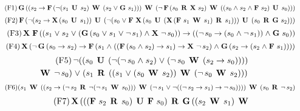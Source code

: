 \begin{table}[h]

\begin{equation}\tag{F1}
\G ((s_2 \mathrel{\rightarrow} \F (\mathop{\neg}(s_1 \U  s_2) \W  (s_2 \mathrel{\vee} \G s_1))) \W  (\mathop{\neg}\F (s_0 \R  \X s_2) \W  ((s_0 \mathrel{\wedge} s_2 \mathrel{\wedge} \F s_2) \U  s_0)))
\end{equation}
%
\squeeze
%
\begin{equation}\tag{F2}
\F (\mathop{\neg}(s_2 \mathrel{\rightarrow} \X (s_0 \U  s_1)) \U  (\mathop{\neg}(s_0 \mathrel{\vee} \F \X (s_0 \U  (\X (\F s_1 \W  s_1) \R  s_1))) 
\U  (s_0 \R  \G s_2)))
\end{equation}
%
\squeeze
%
\begin{equation}\tag{F3}
\X \F ((s_1 \mathrel{\vee} s_2 \mathrel{\vee} (\G (s_0 \mathrel{\vee} s_1 \mathrel{\vee} \mathop{\neg}s_1) \mathrel{\wedge} \X \mathop{\neg}s_0)) \mathrel{\rightarrow} \\
((\mathop{\neg}s_0 \mathrel{\rightarrow} (s_0 \mathrel{\wedge} \mathop{\neg}s_1)) \mathrel{\wedge} \G s_0))
\end{equation}
%
\squeeze
%
\begin{equation}\tag{F4}
\X (\mathop{\neg}\G (s_0 \mathrel{\rightarrow} s_2) \mathrel{\rightarrow} \F (s_1 \mathrel{\wedge} ((\F (s_0 \mathrel{\wedge} s_2) \mathrel{\rightarrow} s_1) \mathrel{\rightarrow} \X \mathop{\neg}s_2) \mathrel{\wedge} \G (s_2 \mathrel{\rightarrow} (s_2 \mathrel{\wedge} \F s_1))))
\end{equation}
%
\squeezemore
%
\begin{multline}\tag{F5}
\mathop{\neg}((s_0 \U  (\mathop{\neg}(\mathop{\neg}s_0 \mathrel{\wedge} s_2) \mathrel{\vee} (\mathop{\neg}s_0 \W  (s_2 \mathrel{\rightarrow} s_0)))) \\
\W  \mathop{\neg}s_0) \mathrel{\vee}
(s_1 \R  ((s_1 \mathrel{\vee} (s_0 \W  s_2)) \W  (\mathop{\neg}s_0 \W  s_2)))
\end{multline}
%
\squeeze
%
\begin{equation}\tag{F6}
(s_1 \W  ((s_2 \mathrel{\rightarrow} (\mathop{\neg}s_2 \R  \mathop{\neg}(\mathop{\neg}s_1 \W  s_0))) \W  (\mathop{\neg}s_1 \mathrel{\vee} \mathop{\neg}((\mathop{\neg}s_2 \mathrel{\rightarrow} s_1) \mathrel{\rightarrow} \mathop{\neg}s_0)))) \W  (s_0 \R  \mathop{\neg}s_2)
\end{equation}
%
\squeezemore
%
\begin{multline}\tag{F7}
\X (((\F s_2 \R  s_0) \U  \F s_0) \R  \G ((s_2 \W  s_1) \W  \\

\end{multline}
\end{table}
